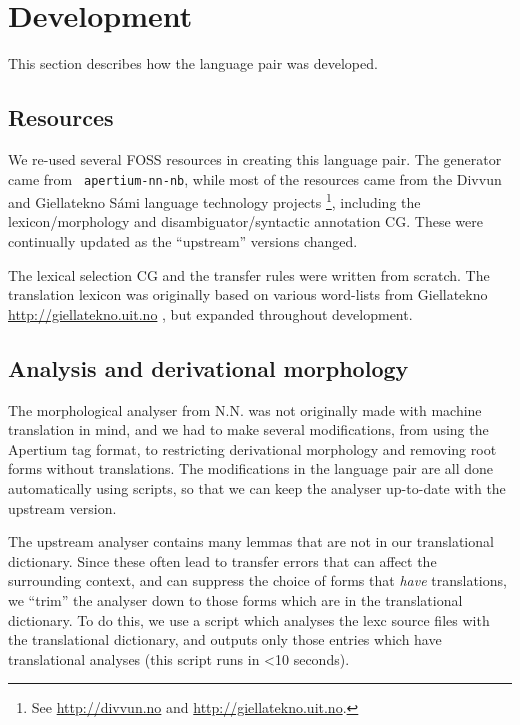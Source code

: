 \section{Development}
  \label{sec:development}

This section describes how the language pair was developed.
\subsection{Resources}
We re-used several FOSS resources in creating this language pair. The
\nob{} generator came from {\tt
  apertium-nn-nb}\citep{unhammer2009rfr}, while most of the \sme{}
resources came from the Divvun and Giellatekno Sámi language
technology projects \footnote{See
  \href{http://divvun.no}{http://divvun.no} and
  \href{http://giellatekno.uit.no}{http://giellatekno.uit.no}.},
including the lexicon/morphology and disambiguator/syntactic
annotation CG. These were continually updated as the ``upstream''
versions changed.

The lexical selection CG and the transfer rules were written from
scratch. The translation lexicon was originally based on various
word-lists from Giellatekno
\href{http://giellatekno.uit.no}{http://giellatekno.uit.no}
, but expanded throughout
development.
\subsection{Analysis and derivational morphology}
The morphological analyser from N.N. was not
originally made with machine translation in mind, and we had to make
several modifications, from using the Apertium tag format, to
restricting derivational morphology and removing root forms without
translations. The modifications in the language pair are all done
automatically using scripts, so that we can keep the analyser
up-to-date with the upstream version.

The upstream analyser contains many lemmas that are not in our
translational dictionary. Since these often lead to transfer errors
that can affect the surrounding context, and can suppress the choice
of forms that \textit{have} translations, we ``trim'' the analyser
down to those forms which are in the translational dictionary. To do
this, we use a script which analyses the lexc source files with the
translational dictionary, and outputs only those entries which have
translational analyses (this script runs in <10 seconds).

